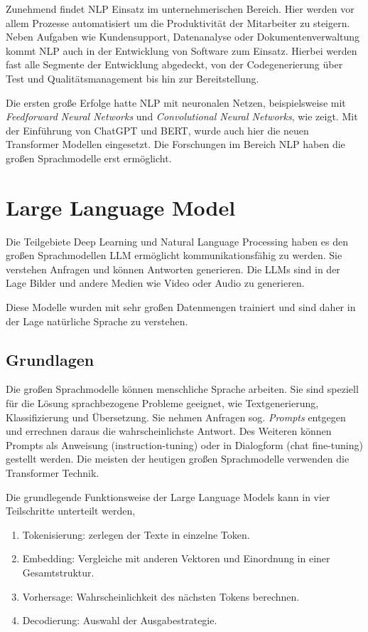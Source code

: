 Zunehmend findet NLP Einsatz im unternehmerischen Bereich. Hier werden vor allem Prozesse automatisiert um die Produktivität der Mitarbeiter zu steigern. Neben Aufgaben wie Kundensupport, Datenanalyse oder Dokumentenverwaltung kommt NLP auch in der Entwicklung von Software zum Einsatz. Hierbei werden fast alle Segmente der Entwicklung abgedeckt, von der Codegenerierung über Test und Qualitätsmanagement bis hin zur Bereitstellung.\vspace{0.2cm}

Die ersten große Erfolge hatte NLP mit neuronalen Netzen, beispielsweise mit \textit{Feedforward Neural Networks} und \textit{Convolutional Neural Networks}, wie \cite{goldberg-2016} zeigt. Mit der Einführung von ChatGPT und BERT, wurde auch hier die neuen Transformer Modellen eingesetzt. Die Forschungen im Bereich NLP haben die großen Sprachmodelle erst ermöglicht.



\section{Large Language Model}
Die Teilgebiete Deep Learning und Natural Language Processing haben es den großen Sprachmodellen \acrshort{LLM} ermöglicht kommunikationsfähig zu werden. Sie verstehen Anfragen und können Antworten generieren. Die LLMs sind in der Lage Bilder und andere Medien wie Video oder Audio zu generieren.\vspace{0.2cm}

Diese Modelle wurden mit sehr großen Datenmengen trainiert und sind daher in der Lage natürliche Sprache zu verstehen.


\subsection{Grundlagen}
Die großen Sprachmodelle können menschliche Sprache arbeiten. Sie sind speziell für die Lösung  sprachbezogene Probleme geeignet, wie Textgenerierung, Klassifizierung und Übersetzung. Sie nehmen Anfragen sog. \textit{Prompts} entgegen und errechnen daraus die wahrscheinlichste Antwort. Des Weiteren können Prompts als Anweisung (instruction-tuning) oder in Dialogform (chat fine-tuning) gestellt werden. Die meisten der heutigen großen Sprachmodelle verwenden die Transformer Technik.\vspace{0.2cm}

Die grundlegende Funktionsweise der Large Language Models kann in vier Teilschritte unterteilt werden,
\begin{enumerate}
	\item Tokenisierung: zerlegen der Texte in einzelne Token.
	\item Embedding: Vergleiche mit anderen Vektoren und Einordnung in einer Gesamtstruktur.
	\item Vorhersage: Wahrscheinlichkeit des nächsten Tokens berechnen.
	\item Decodierung: Auswahl der Ausgabestrategie.
\end{enumerate}

